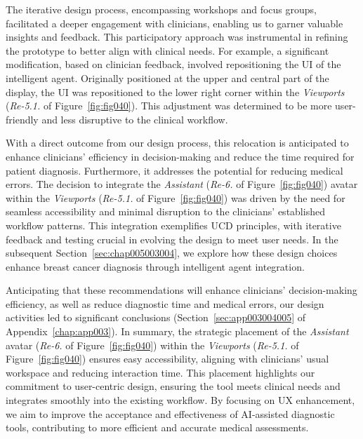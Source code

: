 \vspace{1.00mm}

\textcolor{revised}{The iterative design process, encompassing workshops and focus groups, facilitated a deeper engagement with clinicians, enabling us to garner valuable insights and feedback.
This participatory approach was instrumental in refining the prototype to better align with clinical needs.
For example, a significant modification, based on clinician feedback, involved repositioning the \ac{UI} of the intelligent agent.
Originally positioned at the upper and central part of the display, the \ac{UI} was repositioned to the lower right corner within the {\it Viewports} ({\it Re-5.1.} of Figure~\ref{fig:fig040}).
This adjustment was determined to be more user-friendly and less disruptive to the clinical workflow.}

\textcolor{revised}{With a direct outcome from our design process, this relocation is anticipated to enhance clinicians' efficiency in decision-making and reduce the time required for patient diagnosis.
Furthermore, it addresses the potential for reducing medical errors.
The decision to integrate the {\it Assistant} ({\it Re-6.} of Figure~\ref{fig:fig040}) avatar within the {\it Viewports} ({\it Re-5.1.} of Figure~\ref{fig:fig040}) was driven by the need for seamless accessibility and minimal disruption to the clinicians' established workflow patterns.
This integration exemplifies \ac{UCD} principles, with iterative feedback and testing crucial in evolving the design to meet user needs.
In the subsequent Section~\ref{sec:chap005003004}, we explore how these design choices enhance breast cancer diagnosis through intelligent agent integration.}

\textcolor{revised}{Anticipating that these recommendations will enhance clinicians' decision-making efficiency, as well as reduce diagnostic time and medical errors, our design activities led to significant conclusions (Section~\ref{sec:app003004005} of Appendix~\ref{chap:app003}).
In summary, the strategic placement of the {\it Assistant} avatar ({\it Re-6.} of Figure~\ref{fig:fig040}) within the {\it Viewports} ({\it Re-5.1.} of Figure~\ref{fig:fig040}) ensures easy accessibility, aligning with clinicians' usual workspace and reducing interaction time.
This placement highlights our commitment to user-centric design, ensuring the tool meets clinical needs and integrates smoothly into the existing workflow.
By focusing on \ac{UX} enhancement, we aim to improve the acceptance and effectiveness of \ac{AI}-assisted diagnostic tools, contributing to more efficient and accurate medical assessments.}

